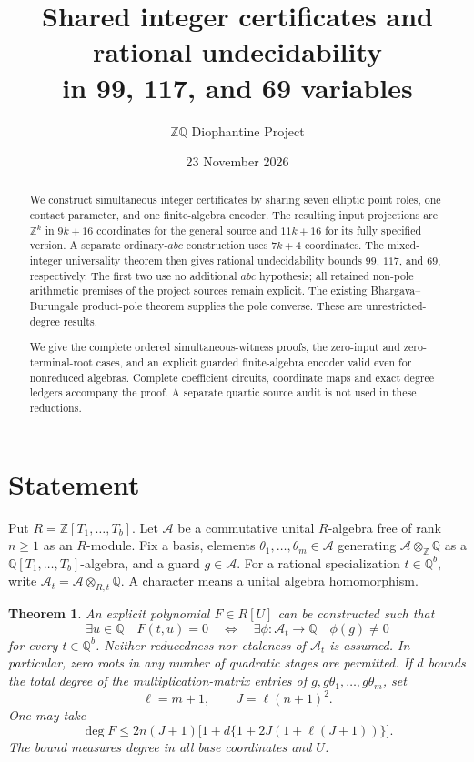 \documentclass[11pt]{article}
\title{Shared integer certificates and rational undecidability\\in 99, 117, and 69 variables}
\author{\(\mathbb Z\mathbb Q\) Diophantine Project}
\date{23 November 2026}
\newtheorem{theorem}{Theorem}
\newcommand{\Q}{\mathbb Q}\newcommand{\Z}{\mathbb Z}
\newcommand{\A}{\mathcal A}
\begin{document}
\maketitle
\begin{abstract}
We construct simultaneous integer certificates by sharing seven elliptic
point roles, one contact parameter, and one finite-algebra encoder. The
resulting input projections are $\mathbb Z^k$ in $9k+16$ coordinates for
the general source and $11k+16$ for its fully specified version. A separate
ordinary-$abc$ construction uses $7k+4$ coordinates. The mixed-integer
universality theorem then gives rational undecidability bounds $99$, $117$,
and $69$, respectively. The first two use no additional $abc$ hypothesis;
all retained non-pole arithmetic premises of the project sources remain
explicit. The existing Bhargava--Burungale product-pole theorem supplies
the pole converse. These are unrestricted-degree results.

We give the complete ordered simultaneous-witness proofs, the zero-input
and zero-terminal-root cases, and an explicit guarded finite-algebra
encoder valid even for nonreduced algebras. Complete coefficient circuits,
coordinate maps and exact degree ledgers accompany the proof. A separate
quartic source audit is not used in these reductions.
\end{abstract}

\section{Statement}
Put $R=\Z[T_1,\ldots,T_b]$. Let $\A$ be a commutative unital $R$-algebra
free of rank $n\ge1$ as an $R$-module. Fix a basis, elements
$\theta_1,\ldots,\theta_m\in\A$ generating
$\A\otimes_{\mathbb Z}\mathbb Q$ as a $\mathbb Q[T_1,\ldots,T_b]$-algebra, and a guard
$g\in\A$. For a rational specialization $t\in\Q^b$, write
$\A_t=\A\otimes_{R,t}\Q$. A character means a unital algebra homomorphism.

\begin{theorem}\label{main}
An explicit polynomial $F\in R[U]$ can be constructed such that
\begin{equation}\label{equivalence}
 \exists u\in\Q\quad F(t,u)=0
 \quad\Longleftrightarrow\quad
 \exists\phi:\A_t\longrightarrow\Q\quad\phi(g)\ne0
\end{equation}
for every $t\in\Q^b$. Neither reducedness nor etaleness of $\A_t$ is
assumed. In particular, zero roots in any number of quadratic stages are
permitted. If $d$ bounds the total degree of the multiplication-matrix
entries of $g,g\theta_1,\ldots,g\theta_m$, set
\[
 \ell=m+1,\qquad J=\ell(n+1)^2.
\]
One may take
\begin{equation}\label{degree}
 \deg F\le
 2n(J+1)\bigl[1+d\{1+2J(1+\ell(J+1))\}\bigr].
\end{equation}
The bound measures degree in all base coordinates and $U$.
\end{theorem}
\end{document}
